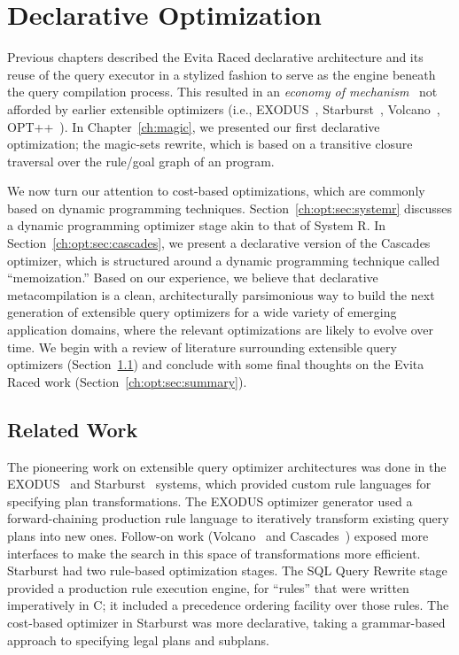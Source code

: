 \chapter[Declarative Optimization]{Declarative Optimization}
\label{ch:opt}

Previous chapters described the Evita Raced declarative architecture and its
reuse of the query executor in a stylized fashion to serve as the engine
beneath the query compilation process.  This resulted in an {\em economy of
mechanism}~\cite{Saltzer75theprotection} not afforded by earlier extensible
optimizers (i.e., EXODUS~\cite{exodus}, Starburst~\cite{phh92},
Volcano~\cite{volcano}, OPT++~\cite{opt++}).  In Chapter~\ref{ch:magic}, we
presented our first declarative optimization; the magic-sets rewrite, which is
based on a transitive closure traversal over the rule/goal graph of an \OVERLOG
program.

We now turn our attention to cost-based optimizations, which are commonly based
on dynamic programming techniques.  Section~\ref{ch:opt:sec:systemr} discusses
a dynamic programming optimizer stage akin to that of System R.  In
Section~\ref{ch:opt:sec:cascades}, we present a declarative version of the
Cascades optimizer, which is structured around a dynamic programming technique
called ``memoization.'' Based on our experience, we believe that declarative
metacompilation is a clean, architecturally parsimonious way to build the next
generation of extensible query optimizers for a wide variety of emerging
application domains, where the relevant optimizations are likely to evolve over
time.  We begin with a review of literature surrounding extensible query
optimizers (Section~\ref{ch:opt:sec:related}) and conclude with some final
thoughts on the Evita Raced work (Section~\ref{ch:opt:sec:summary}).

\section{Related Work}
\label{ch:opt:sec:related}

The pioneering work on extensible query optimizer architectures was done in the
EXODUS~\cite{exodus} and Starburst~\cite{lohman,phh92} systems, which provided
custom rule languages for specifying plan transformations.  The EXODUS
optimizer generator used a forward-chaining production rule language to iteratively
transform existing query plans into new ones.  Follow-on work
(Volcano~\cite{volcano} and Cascades~\cite{cascades}) exposed more interfaces
to make the search in this space of transformations more efficient.  Starburst
had two rule-based optimization stages.  The SQL Query Rewrite stage provided a
production rule execution engine, for ``rules'' that were written imperatively
in C; it included a precedence ordering facility over those rules.  The
cost-based optimizer in Starburst was more declarative, taking a grammar-based
approach to specifying legal plans and subplans.

